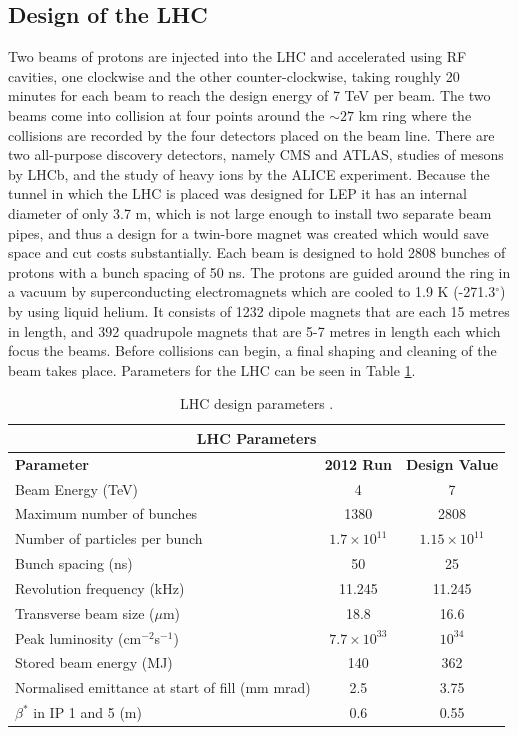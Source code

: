 \subsection{Design of the LHC}

Two beams of protons are injected into the LHC and accelerated using RF cavities, one clockwise and the other counter-clockwise, taking roughly 20 minutes for each beam to reach the design energy of 7 TeV per beam. The two beams come into collision at four points around the $\sim27$ km ring where the collisions are recorded by the four detectors placed on the beam line. There are two all-purpose discovery detectors, namely CMS and ATLAS, studies of mesons by LHCb, and the study of heavy ions by the ALICE experiment. Because the tunnel in which the LHC is placed was designed for LEP it has an internal diameter of only 3.7 m, which is not large enough to install two separate beam pipes, and thus a design for a twin-bore magnet \cite{LHCStorageAccelerators} was created which would save space and cut costs substantially. Each beam is designed to hold 2808 bunches of protons with a bunch spacing of 50 ns. The protons are guided around the ring in a vacuum by superconducting electromagnets which are cooled to 1.9 K (-271.3$^\circ$) by using liquid helium. It consists of 1232 dipole magnets that are each 15 metres in length, and 392 quadrupole magnets that are 5-7 metres in length each which focus the beams. Before collisions can begin, a final shaping and cleaning of the beam takes place. Parameters for the LHC can be seen in Table \ref{tab-LHCparameters}.

\begin{table} 
\begin{center}
\begin{tabular}{|l|c|c|}
\hline
	\multicolumn{3}{|c|}{\textbf{LHC Parameters}} \\
\hline
	\textbf{Parameter} & \textbf{2012 Run} & \textbf{Design Value} \\
\hline	
	Beam Energy (TeV) & 4 & 7 \\
	Maximum number of bunches  & 1380 & 2808 \\
	Number of particles per bunch & $1.7\times 10^{11}$ & $1.15\times 10^{11}$ \\
	Bunch spacing (ns) & 50 & 25 \\
	Revolution frequency (kHz) & 11.245 & 11.245 \\
	Transverse beam size ($\mu$m) & 18.8 & 16.6 \\
	Peak luminosity (cm$^{-2}$s$^{-1}$) & $7.7\times 10^{33}$ & $10^{34}$ \\
	Stored beam energy (MJ) & 140 & 362 \\
	Normalised emittance at start of fill (mm mrad) & 2.5 & 3.75 \\
	$\beta^*$ in IP 1 and 5 (m) & 0.6 & 0.55 \\
\hline
\end{tabular}
\end{center}
\caption{LHC design parameters \cite{LHCDesignReport}.}
\label{tab-LHCparameters}
\end{table}


